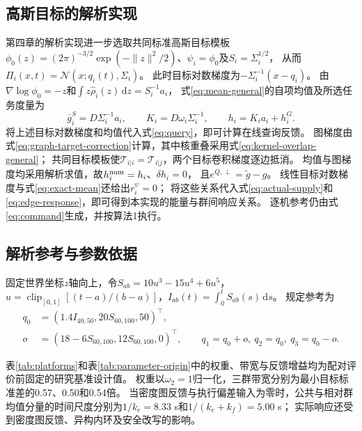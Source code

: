 \documentclass[UTF8,a4paper,11pt,fontset=none]{ctexart}
\begin{document}
\subsection{高斯目标的解析实现}\label{app:gaussian-implementation}
第四章的解析实现进一步选取共同标准高斯目标模板
$\phi_0(z)=(2\pi)^{-3/2}\exp(-\|z\|^2/2)$、$\psi_i=\phi_0$及$S_i=\Sigma_i^{1/2}$，
从而$\Pi_i(x,t)=\mathcal N(x;q_i(t),\Sigma_i)$。
此时目标对数梯度为$-\Sigma_i^{-1}(x-q_i)$。
由$\nabla\log\phi_0=-z$和$\int z\widehat\rho_i(z)\,\mathrm dz=S_i^{-1}a_i$，
式\eqref{eq:mean-general}的自项均值及所选任务度量为
\begin{equation}
\bar g_i^S=D\Sigma_i^{-1}a_i,\qquad
K_i=D\omega_i\Sigma_i^{-1},\qquad h_i=K_i a_i+h_i^G .
\label{eq:exact-mean}
\end{equation}
将上述目标对数梯度和均值代入式\eqref{eq:query}，即可计算在线查询反馈。
图梯度由式\eqref{eq:graph-target-correction}计算，其中核重叠采用式\eqref{eq:kernel-overlap-general}；
共同目标模板使$\mathcal T_{i|i}=\mathcal T_{i|j}$，两个目标卷积梯度逐边抵消。
均值与图梯度均采用解析求值，故$h_i^{\rm num}=h_i$、$\delta h_i=0$，
且$e^{Q,\perp}=\widetilde g-g$。
线性目标对数梯度与式\eqref{eq:exact-mean}还给出$r_i^\psi=0$；
将这些关系代入式\eqref{eq:actual-supply}和\eqref{eq:edge-response}，即可得到本实现的能量与群间响应关系。
逐机参考仍由式\eqref{eq:command}生成，并按算法1执行。

\subsection{解析参考与参数依据}
固定世界坐标$z$轴向上，令$S_{ab}=10u^3-15u^4+6u^5$，
$u=\operatorname{clip}_{[0,1]}[(t-a)/(b-a)]$，$I_{ab}(t)=\int_0^tS_{ab}(s)\,\mathrm ds$。
规定参考为
\begin{equation}
\begin{aligned}
q_0&=(1.4I_{40,50},20S_{60,100},50)^\top,\\
o&=(18-6S_{60,100},12S_{60,100},0)^\top,\qquad
q_1=q_0+o,\ q_2=q_0,\ q_3=q_0-o .
\end{aligned}\label{eq:engineering-reference}
\end{equation}

表\ref{tab:platforms}和表\ref{tab:parameter-origin}中的权重、带宽与反馈增益均为配对评价前固定的研究基准设计值。
权重以$\omega_2=1$归一化，三群带宽分别为最小目标标准差的0.57、0.50和0.54倍。
当密度图反馈与执行偏差输入为零时，公共与相对群均值分量的时间尺度分别为$1/k_c=8.33$ s和$1/(k_c+k_f)=5.00$ s；
实际响应还受到密度图反馈、异构内环及安全改写的影响。
\end{document}
